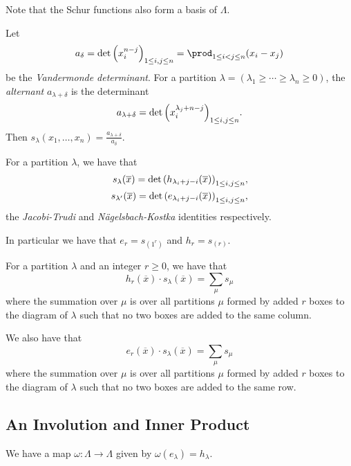 \documentclass[letterpaper]{article}
\begin{document}
Note that the Schur functions also form a basis of $\Lambda$.

\begin{prop}
  Let
  \[
    a_\delta = \det\pqty{x_i^{n - j}}_{1 \leq i, j \leq n} = \prod_{1 \leq i < j \leq n} (x_i - x_j)
  \]
  be the \emph{Vandermonde determinant}.
  For a partition $\lambda = (\lambda_1 \geq \cdots \geq \lambda_n \geq 0)$, the \emph{alternant} $a_{\lambda + \delta}$ is the determinant
  \[
    a_{\lambda + \delta} = \det\pqty{x_i^{\lambda_j + n - j}}_{1 \leq i, j \leq n}.
  \]
  Then $s_\lambda(x_1, \ldots, x_n) = \frac{a_{\lambda + \delta}}{a_\delta}$.
\end{prop}

\begin{prop}
  For a partition $\lambda$, we have that
  \begin{align*}
    s_\lambda(\overline{x}) = \det\pqty{h_{\lambda_i + j - i}(\overline{x})}_{1 \leq i, j \leq n}, \\
    s_{\lambda'}(\overline{x}) = \det\pqty{e_{\lambda_i + j - i}(\overline{x})}_{1 \leq i, j \leq n},
  \end{align*}
  the \emph{Jacobi-Trudi} and \emph{N\"{a}gelsbach-Kostka} identities respectively.
\end{prop}
In particular we have that $e_r = s_{(1^r)}$ and $h_r = s_{(r)}$.

\begin{thrm}
  For a partition $\lambda$ and an integer $r \geq 0$, we have that
  \[
    h_r(\overline{x}) \cdot s_\lambda(\overline{x}) = \sum_{\mu} s_\mu
  \]
  where the summation over $\mu$ is over all partitions $\mu$ formed by added $r$ boxes to the diagram of $\lambda$ such that no two boxes are added to the same column.

  We also have that
  \[
    e_r(\overline{x}) \cdot s_\lambda(\overline{x}) = \sum_{\mu} s_\mu
  \]
  where the summation over $\mu$ is over all partitions $\mu$ formed by added $r$ boxes to the diagram of $\lambda$ such that no two boxes are added to the same row.
\end{thrm}

\clearpage

\subsection{An Involution and Inner Product}

\begin{defn}
  We have a map $\omega\colon \Lambda \to \Lambda$ given by $\omega(e_\lambda) = h_\lambda$.
\end{defn}
\end{document}
